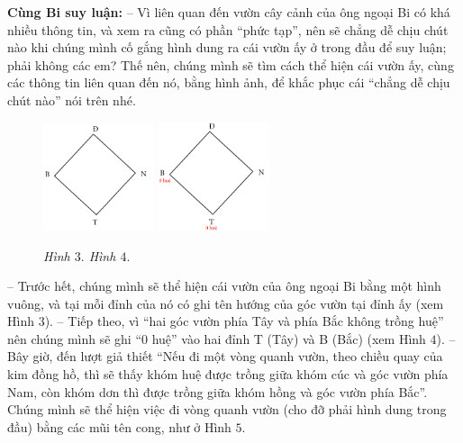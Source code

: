 	\vskip 0.1cm
	\textbf{\color{toancuabi}Cùng Bi suy luận:}
	\vskip 0.1cm
	-- Vì liên quan đến vườn cây cảnh của ông ngoại Bi có khá nhiều thông tin, và xem ra cũng có phần “phức tạp”, nên sẽ chẳng dễ chịu chút nào khi chúng mình cố gắng hình dung ra cái vườn ấy ở trong đầu để suy luận; phải không các em? Thế nên, chúng mình sẽ tìm cách thể hiện cái vườn ấy, cùng các thông tin liên quan đến nó, bằng hình ảnh, để khắc phục cái “chẳng dễ chịu chút nào” nói trên nhé.
	\vskip 0.1cm
	\begin{figure}
		\vspace*{-20pt}
		\centering
		\captionsetup{labelformat=empty, justification=centering}
		\includegraphics[width= 0.29\textwidth]{pic3}
		\includegraphics[width=0.29\textwidth]{pic4}
		\caption{\small\textit{Hình $3.$ \hspace*{50pt}Hình $4.$}}
		\vspace*{-15pt}
	\end{figure}
	-- Trước hết, chúng mình sẽ thể hiện cái vườn của ông ngoại Bi bằng một hình vuông, và tại mỗi đỉnh của nó có ghi tên hướng của góc vườn tại đỉnh ấy (xem Hình $3$).
	\vskip 0.15cm
	-- Tiếp theo, vì “hai góc vườn phía Tây và phía Bắc không trồng huệ” nên chúng mình sẽ ghi “0 huệ” vào hai đỉnh T (Tây) và B (Bắc) (xem Hình $4$).
	\vskip 0.15cm
	-- Bây giờ, đến lượt giả thiết “Nếu đi một vòng quanh vườn, theo chiều quay của kim đồng hồ, thì sẽ thấy khóm huệ được trồng giữa khóm cúc và góc vườn phía Nam, còn khóm dơn thì được trồng giữa khóm hồng và góc vườn phía Bắc”. Chúng mình sẽ thể hiện việc đi vòng quanh vườn (cho đỡ phải hình dung trong đầu) bằng các mũi tên cong, như ở Hình $5$.
	\vskip 0.1cm
